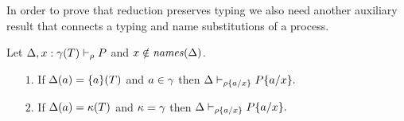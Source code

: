 In order to prove that reduction preserves typing we also need another auxiliary result that connects a typing and name substitutions of a process.
\begin{lemma}[Substitution]\label{lemm:Substitution_lemma}

Let $ \Delta,x:\gamma(T)\vdash_\rho P$ and $x\notin\mathit{names}(\Delta)$. 
\begin{itemize}
\item[$1$.] If $\Delta(a)=\{a\}(T)$  and $a\in \gamma$ then $\Delta\vdash_{\rho\{a/x\}} P\{a/x\}.$
\item[$2$.] If $\Delta(a)={\mathbf{\kappa}}(T)$  and ${\mathbf{\kappa}}=\gamma$ then $\Delta\vdash_{\rho\{a/x\}} P\{a/x\}.$
\end{itemize}

\end{lemma}
